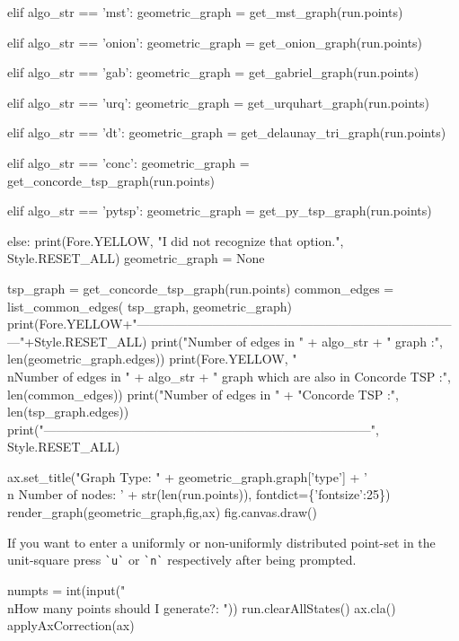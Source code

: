 elif algo_str == 'mst':
     geometric_graph = get_mst_graph(run.points)

elif algo_str == 'onion':
     geometric_graph = get_onion_graph(run.points)

elif algo_str == 'gab':
     geometric_graph = get_gabriel_graph(run.points)

elif algo_str == 'urq':
     geometric_graph = get_urquhart_graph(run.points)

elif algo_str == 'dt':
      geometric_graph = get_delaunay_tri_graph(run.points)

elif algo_str == 'conc':
     geometric_graph = get_concorde_tsp_graph(run.points)

elif algo_str == 'pytsp':
     geometric_graph = get_py_tsp_graph(run.points)

else:
      print(Fore.YELLOW, "I did not recognize that option.", Style.RESET_ALL)
      geometric_graph = None

tsp_graph = get_concorde_tsp_graph(run.points)
common_edges = list_common_edges( tsp_graph, geometric_graph)
print(Fore.YELLOW+"------------------------------------------------------------------------------"+Style.RESET_ALL)
print("Number of edges in " + algo_str + " graph                                :", len(geometric_graph.edges))
print(Fore.YELLOW, "\\nNumber of edges in " + algo_str + " graph which are also in Concorde TSP :", len(common_edges))
print("Number of edges in " + "Concorde TSP                              :", len(tsp_graph.edges))
print("------------------------------------------------------------------------------", Style.RESET_ALL)


ax.set_title("Graph Type: " + geometric_graph.graph['type'] + '\\n Number of nodes: ' + str(len(run.points)), fontdict=\{'fontsize':25\})
render_graph(geometric_graph,fig,ax)
fig.canvas.draw()
\nwendcode{}\nwdocspar

If you want to enter a uniformly or non-uniformly distributed point-set in the unit-square press \verb|`u`| or \verb|`n`|
respectively after being prompted. 

\nwenddocs{}\endmoddef\nwstartdeflinemarkup{}\nwenddeflinemarkup
numpts = int(input("\\nHow many points should I generate?: ")) 
run.clearAllStates()
ax.cla()
applyAxCorrection(ax)

